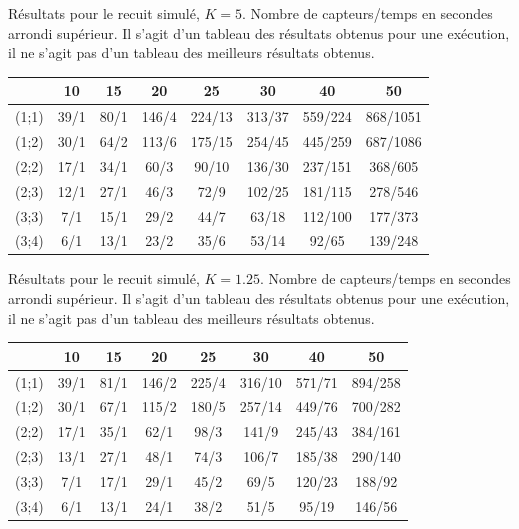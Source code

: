 \documentclass[12pt,a4paper]{article}
\begin{document}
Résultats pour le recuit simulé, $K=5$. 
Nombre de capteurs/temps en secondes arrondi supérieur. Il s'agit d'un tableau des résultats obtenus pour une exécution, il ne s'agit pas d'un tableau des meilleurs résultats obtenus.

\begin{center}
\begin{tabular}{|c|c|c|c|c|c|c|c|}
\hline
&10 & 15 & 20 & 25 & 30 & 40 & 50\\
\hline 
(1;1) & 39/1 & 80/1 & 146/4 & 224/13 & 313/37 & 559/224 & 868/1051 \\ 
\hline 
(1;2) & 30/1 & 64/2 & 113/6 & 175/15 & 254/45 & 445/259 & 687/1086 \\ 
\hline 
(2;2) & 17/1 & 34/1 & 60/3 & 90/10 & 136/30 & 237/151 & 368/605 \\ 
\hline 
(2;3) & 12/1 & 27/1 & 46/3& 72/9 & 102/25 & 181/115 & 278/546 \\ 
\hline 
(3;3) & 7/1 & 15/1 & 29/2 & 44/7 & 63/18 & 112/100 & 177/373 \\ 
\hline 
(3;4) & 6/1 & 13/1 & 23/2 & 35/6 & 53/14 & 92/65 & 139/248 \\ 
\hline 
\end{tabular} 
\end{center}

Résultats pour le recuit simulé, $K=1.25$. Nombre de capteurs/temps en secondes arrondi supérieur. Il s'agit d'un tableau des résultats obtenus pour une exécution, il ne s'agit pas d'un tableau des meilleurs résultats obtenus.

\begin{center}
\begin{tabular}{|c|c|c|c|c|c|c|c|}
\hline
&10 & 15 & 20 & 25 & 30 & 40 & 50\\
\hline 
(1;1) & 39/1 & 81/1 & 146/2 & 225/4 & 316/10 & 571/71 & 894/258 \\ 
\hline 
(1;2) & 30/1 & 67/1 & 115/2 & 180/5 & 257/14 & 449/76 & 700/282 \\ 
\hline 
(2;2) & 17/1 & 35/1 & 62/1 & 98/3 & 141/9 & 245/43 & 384/161 \\ 
\hline 
(2;3) & 13/1 & 27/1 & 48/1& 74/3 & 106/7 & 185/38 & 290/140 \\ 
\hline 
(3;3) & 7/1 & 17/1 & 29/1 & 45/2 & 69/5 & 120/23 & 188/92 \\ 
\hline 
(3;4) & 6/1 & 13/1 & 24/1 & 38/2 & 51/5 & 95/19 & 146/56 \\ 
\hline 
\end{tabular} 
\end{center}
\end{document}
